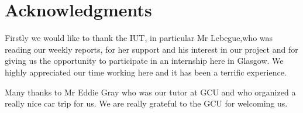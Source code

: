 \chapter*{Acknowledgments}

{\large

Firstly we would like to thank the IUT, in particular Mr Lebegue,who was reading our weekly reports, for her support and his interest in our project and for giving us the opportunity to participate in an internship here in Glasgow. We highly appreciated our time working here and it has been a terrific experience.\linebreak

Many thanks to Mr Eddie Gray who was our tutor at GCU and who organized a really nice car trip for us. We are really grateful to the GCU for welcoming us.\linebreak

}